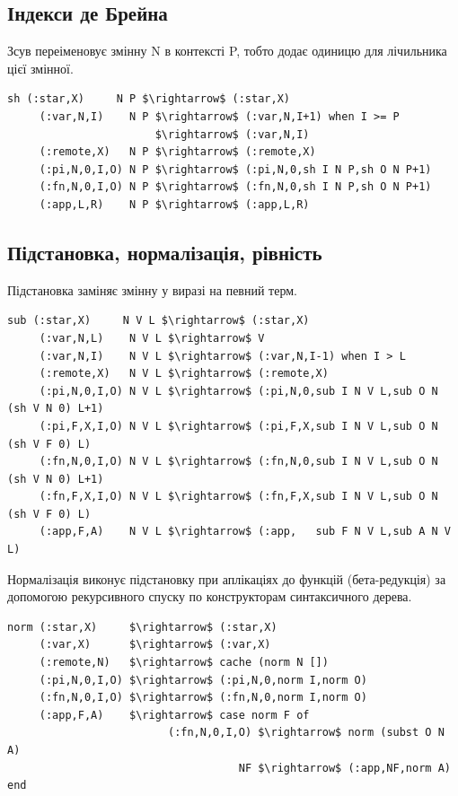 \subsection{Індекси де Брейна}
Зсув переіменовує змінну N в контексті P, тобто додає одиницю для лічильника цієї змінної.

\begin{lstlisting}[mathescape=true]
  sh (:star,X)     N P $\rightarrow$ (:star,X)
     (:var,N,I)    N P $\rightarrow$ (:var,N,I+1) when I >= P
                       $\rightarrow$ (:var,N,I)
     (:remote,X)   N P $\rightarrow$ (:remote,X)
     (:pi,N,0,I,O) N P $\rightarrow$ (:pi,N,0,sh I N P,sh O N P+1)
     (:fn,N,0,I,O) N P $\rightarrow$ (:fn,N,0,sh I N P,sh O N P+1)
     (:app,L,R)    N P $\rightarrow$ (:app,L,R)
\end{lstlisting}

\subsection{Підстановка, нормалізація, рівність}
Підстановка заміняє змінну у виразі на певний терм.

\begin{lstlisting}[mathescape=true]
 sub (:star,X)     N V L $\rightarrow$ (:star,X)
     (:var,N,L)    N V L $\rightarrow$ V
     (:var,N,I)    N V L $\rightarrow$ (:var,N,I-1) when I > L
     (:remote,X)   N V L $\rightarrow$ (:remote,X)
     (:pi,N,0,I,O) N V L $\rightarrow$ (:pi,N,0,sub I N V L,sub O N (sh V N 0) L+1)
     (:pi,F,X,I,O) N V L $\rightarrow$ (:pi,F,X,sub I N V L,sub O N (sh V F 0) L)
     (:fn,N,0,I,O) N V L $\rightarrow$ (:fn,N,0,sub I N V L,sub O N (sh V N 0) L+1)
     (:fn,F,X,I,O) N V L $\rightarrow$ (:fn,F,X,sub I N V L,sub O N (sh V F 0) L)
     (:app,F,A)    N V L $\rightarrow$ (:app,   sub F N V L,sub A N V L)
\end{lstlisting}

Нормалізація виконує підстановку при аплікаціях до функцій (бета-редукція)
за допомогою рекурсивного спуску по конструкторам синтаксичного дерева.

\begin{lstlisting}[mathescape=true]
norm (:star,X)     $\rightarrow$ (:star,X)
     (:var,X)      $\rightarrow$ (:var,X)
     (:remote,N)   $\rightarrow$ cache (norm N [])
     (:pi,N,0,I,O) $\rightarrow$ (:pi,N,0,norm I,norm O)
     (:fn,N,0,I,O) $\rightarrow$ (:fn,N,0,norm I,norm O)
     (:app,F,A)    $\rightarrow$ case norm F of
                         (:fn,N,0,I,O) $\rightarrow$ norm (subst O N A)
                                    NF $\rightarrow$ (:app,NF,norm A) end
\end{lstlisting}

